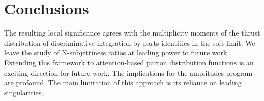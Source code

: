 \section{Conclusions}\label{sec:conclusions}

The resulting local significance agrees with the multiplicity moments of
the thrust distribution of discriminative integration-by-parts
identities in the soft limit. We leave the study of N-subjettiness
ratios at leading power to future work. Extending this framework to
attention-based parton distribution functions is an exciting direction
for future work. The implications for the amplitudes program are
profound. The main limitation of this approach is its reliance on
leading singularities.

